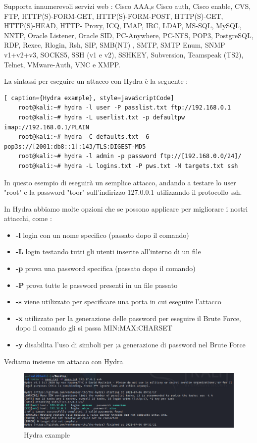 Supporta innumerevoli servizi web : Cisco AAA,s Cisco auth, Cisco enable, CVS, FTP, HTTP(S)-FORM-GET, HTTP(S)-FORM-POST, HTTP(S)-GET, HTTP(S)-HEAD, HTTP- Proxy, ICQ, IMAP, IRC, LDAP, MS-SQL, MySQL, NNTP, Oracle Listener, Oracle SID, PC-Anywhere, PC-NFS, POP3, PostgreSQL, RDP, Rexec, Rlogin, Rsh, SIP, SMB(NT) , SMTP, SMTP Enum, SNMP v1+v2+v3, SOCKS5, SSH (v1 e v2), SSHKEY, Subversion, Teamspeak (TS2), Telnet, VMware-Auth, VNC e XMPP.

La sintassi per eseguire un attacco con Hydra è la seguente :

\begin{lstlisting}[ caption={Hydra example}, style=javaScriptCode]
    root@kali:~# hydra -l user -P passlist.txt ftp://192.168.0.1
    root@kali:~# hydra -L userlist.txt -p defaultpw imap://192.168.0.1/PLAIN
    root@kali:~# hydra -C defaults.txt -6 pop3s://[2001:db8::1]:143/TLS:DIGEST-MD5
    root@kali:~# hydra -l admin -p password ftp://[192.168.0.0/24]/
    root@kali:~# hydra -L logins.txt -P pws.txt -M targets.txt ssh
\end{lstlisting}

In questo esempio di eseguirà un semplice attacco, andando a testare lo user "root" e la password "toor" sull'indirizzo 127.0.0.1 utilizzando il protocollo ssh.

In Hydra abbiamo molte opzioni che se possono applicare per migliorare i nostri attacchi, come :
\begin{itemize}
    \item \textbf{-l} login con un nome specifico (passato dopo il comando)
    \item \textbf{-L} login testando tutti gli utenti inserite all'interno di un file 
    \item \textbf{-p} prova una password specifica (passato dopo il comando)
    \item \textbf{-P} prova tutte le password presenti in un file passato
    \item \textbf{-s} viene utilizzato per specificare una porta in cui eseguire l'attacco 
    \item \textbf{-x} utilizzato per la generazione delle password per eseguire il Brute Force, dopo il comando gli si passa MIN:MAX:CHARSET
    \item \textbf{-y} disabilita l'uso di simboli per ;a generazione di password nel Brute Force
\end{itemize}

Vediamo insieme un attacco con Hydra 

\begin{figure}[htpb!]
    \centering
    \includegraphics[width=\linewidth]{Immagini/5/hydra.png}
    \caption{Hydra example}
    \label{fig:Hydra example}
\end{figure}

